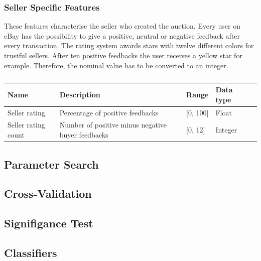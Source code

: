 \subsubsection{Seller Specific Features}
These features characterise the seller who created the auction. Every user on eBay has the possibility to give a positive, neutral or negative feedback after every transaction. The rating system awards stars with twelve different colors for trustful sellers. After ten positive feedbacks the user receives a yellow star for example. Therefore, the nominal value has to be converted to an integer.
\begin{table}[h!]
	\begin{center}
	\begin{tabular}{| l | l | l | l | l |}
		\hline
		Name & Description &  Range & Data type \\
		\hline
		Seller rating & Percentage of positive feedbacks & [0, 100] & Float \\
		\hline
		Seller rating count & Number of positive minus negative buyer feedbacks & [0, 12] & Integer \\
		\hline
	\end{tabular}
	\end{center}
	\caption{}
\end{table}
\subsection{Parameter Search}
\subsection{Cross-Validation}
\subsection{Signifigance Test}
\subsection{Classifiers}
